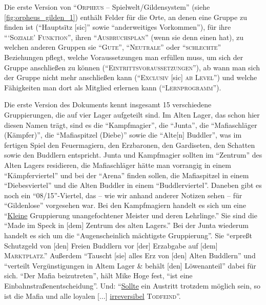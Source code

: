 \documentclass[a5paper,pagesize,numbers=noenddot]{scrbook}
\begin{document}
Die erste Version von \enquote{\textsc{Orpheus} -- Spielwelt/Gildensystem} (siehe \autoref{fig:orpheus_gilden_1}) enthält Felder für die Orte, an denen eine Gruppe zu finden ist (\enquote{Hauptsïtz [sic]} sowie \enquote{anderweitiges Vorkommen}), für ihre \enquote{\enquote{\textsc{Soziale}} \textsc{Funktion}}, ihren \enquote{\textsc{Ausbruchsplan}} (wenn sie denn einen hat), zu welchen anderen Gruppen sie \enquote{\textsc{Gute}}, \enquote{\textsc{Neutrale}} oder \enquote{\textsc{schlechte}} Beziehungen pflegt, welche Voraussetzungen man erfüllen muss, um sich der Gruppe anschließen zu können (\enquote{\textsc{Eintrittsvoraussetzungen}}), ab wann man sich der Gruppe nicht mehr anschließen kann (\enquote{\textsc{Exclusiv} [sic] \textsc{ab Level}}) und welche Fähigkeiten man dort als Mitglied erlernen kann (\enquote{\textsc{Lernprogramm}}).

Die erste Version des Dokuments kennt insgesamt 15 verschiedene Gruppierungen, die auf vier Lager aufgeteilt sind.
Im Alten Lager, das schon hier diesen Namen trägt, sind es die \enquote{Kampfmagier}, die \enquote{Junta}, die \enquote{Mafiaschläger (Kämpfer)}, die \enquote{Mafiaspitzel (Diebe)} sowie die \enquote{Alte[n] Buddler}, was im fertigen Spiel den Feuermagiern, den Erzbaronen, den Gardiseten, den Schatten sowie den Buddlern entspricht.
Junta und Kampfmagier sollten im \enquote{Zentrum} des Alten Lagers residieren, die Mafiaschläger hätte man vorrangig in einem \enquote{Kämpferviertel} und bei der \enquote{Arena} finden sollen, die Mafiaspitzel in einem \enquote{Diebesviertel} und die Alten Buddler in einem \enquote{Buddlerviertel}.
Daneben gibt es noch ein \enquote{08/15}-Viertel, das -- wie wir anhand anderer Notizen sehen -- für \enquote{Gildenlose}\autocite[S.~15]{orpheus_b_scribbles} vorgesehen war.
Bei den Kampfmagiern handelt es sich um eine \enquote{\uline{Kleine} Gruppierung unangefochtener Meister und deren Lehrlinge.} Sie sind die \enquote{Made im Speck in [dem] Zentrum des alten Lagers.}
Bei der Junta wiederum handelt es sich um die \enquote{Augenscheinlich mächtigste Gruppierung}.
Sie \enquote{erpreßt Schutzgeld von [den] Freien Buddlern vor [der] Erzabgabe auf [dem] \textsc{Marktplatz}.}
Außerdem \enquote{Tauscht [sie] alles Erz von [den] Alten Buddlern} und \enquote{verteilt Vergünstigungen in Altem Lager \& behält [den] Löwenanteil} dabei für sich.
\enquote{Der Mafia beizutreten}, hält Mike Hoge fest, \enquote{ist eine Einbahnstraßenentscheidung}.
Und:
\enquote{\uline{Sollte} ein Austritt trotzdem möglich sein, so ist die Mafia und alle loyalen [$\ldots$] \uline{irreversibel} \textsc{Todfeind}}.
\end{document}
